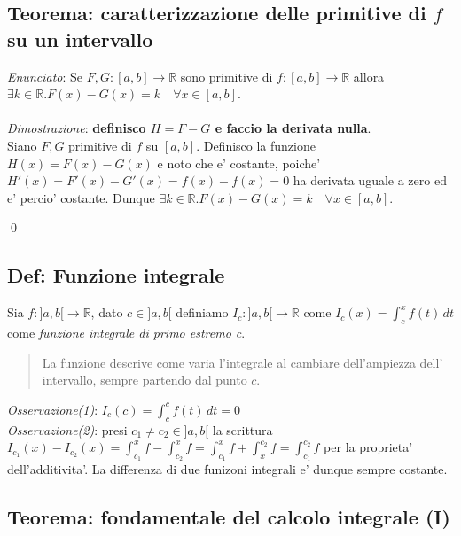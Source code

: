 \documentclass{article}
\begin{document}
\subsection{Teorema: caratterizzazione delle primitive di $f$ su un intervallo}

\emph{Enunciato}: Se $F, G: [a, b] \to \mathbb{R}$ sono primitive di $f: [a, b]
\to \mathbb{R}$ allora $\exists k \in \mathbb{R}. F(x) - G(x) = k \quad \forall
x \in [a, b]$. \\ \\
\emph{Dimostrazione}: \textbf{definisco $H = F - G$ e faccio la derivata nulla}.\\
Siano $F, G$ primitive di $f$ su $[a, b]$. Definisco la funzione
$H(x) = F(x) - G(x)$ e noto che e' costante, poiche' $H'(x) = F'(x) - G'(x) = 
f(x) - f(x) = 0$ ha derivata uguale a zero ed e' percio' costante. Dunque $\exists
k \in \mathbb{R}. F(x) - G(x) = k \quad \forall x \in [a, b]$.

\qed

\subsection{Def: Funzione integrale}

Sia $f: ] a, b [ \to \mathbb{R}$, dato $c \in ] a, b [$ definiamo $I_c: ] a, b [
\to \mathbb{R}$ come $I_c(x) = \int_c^x f(t) \, dt$ come \emph{funzione integrale
di primo estremo c}.
\begin{quote}
  La funzione descrive come varia l'integrale al cambiare dell'ampiezza dell'
  intervallo, sempre partendo dal punto $c$.
\end{quote}
\emph{Osservazione(1)}: $I_c(c) = \int_c^c f(t) \, dt = 0$ \\
\emph{Osservazione(2)}: presi $c_1 \neq c_2 \in ] a, b [$ la scrittura $I_{c_1}(x)
- I_{c_2}(x) = \int_{c_1}^x f - \int_{c_2}^x f = \int_{c_1}^x f + \int_x^{c_2} f =
\int_{c_1}^{c_2} f$ per la proprieta' dell'additivita'. La differenza di due funizoni
integrali e' dunque sempre costante.

\subsection{Teorema: fondamentale del calcolo integrale (I)}
\end{document}
